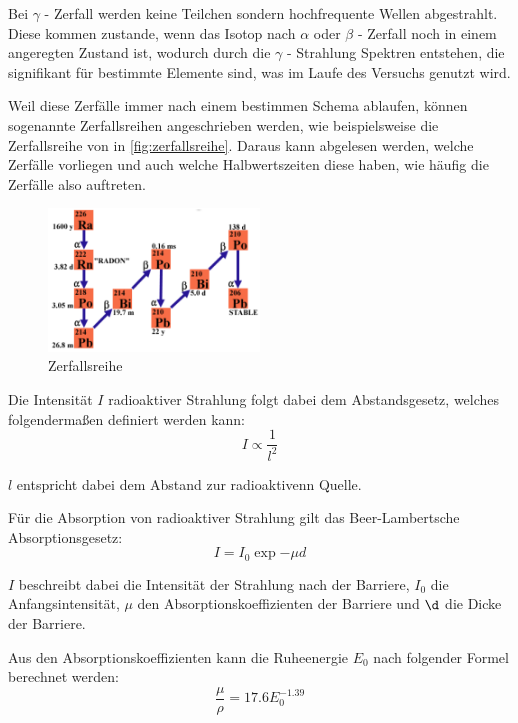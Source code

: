 \documentclass[12pt,english,ngerman]{scrartcl}
\begin{document}
Bei $\gamma$ - Zerfall werden keine Teilchen sondern hochfrequente Wellen abgestrahlt. Diese kommen zustande,
wenn das Isotop nach $\alpha$ oder $\beta$ - Zerfall noch in einem angeregten Zustand ist, wodurch durch die
$\gamma$ - Strahlung Spektren entstehen, die signifikant für bestimmte Elemente sind, was im Laufe des Versuchs 
genutzt wird.


Weil diese Zerfälle immer nach einem bestimmen Schema ablaufen, können sogenannte Zerfallsreihen angeschrieben werden, 
wie beispielsweise die Zerfallsreihe von  in \autoref{fig:zerfallsreihe}. Daraus kann abgelesen
werden, welche Zerfälle vorliegen und auch welche Halbwertszeiten diese haben, wie häufig die Zerfälle also auftreten.

\begin{figure}[H]
  \begin{center}
  \includegraphics[width=0.5\textwidth]{./figures/zerfallsreihe.png}
	\end{center}
	\caption{Zerfallsreihe  \cite[]{}}
	\label{fig:zerfallsreihe}
    
\end{figure}


Die Intensität $I$ radioaktiver Strahlung folgt dabei dem Abstandsgesetz, welches folgendermaßen definiert werden kann:
\begin{equation}
  I \propto \frac{1}{l^2}
\end{equation}

$l$ entspricht dabei dem Abstand zur radioaktivenn Quelle.

Für die Absorption von radioaktiver Strahlung gilt das Beer-Lambertsche Absorptionsgesetz:
\begin{equation}
  I = I_0 \exp{-\mu d}
\end{equation}

$I$ beschreibt dabei die Intensität der Strahlung nach der Barriere, $I_0$ die Anfangsintensität, 
$\mu$ den Absorptionskoeffizienten der Barriere und $\d$ die Dicke der Barriere.

Aus den Absorptionskoeffizienten kann die Ruheenergie $E_0$ nach folgender Formel berechnet werden:
\begin{equation}
  \frac{\mu}{\rho} = 17.6 E_0^{-1.39}
\end{equation}
\end{document}
